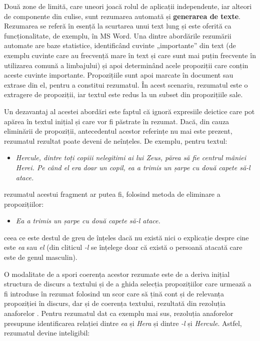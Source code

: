\begin{multicols}{2}
Două zone de limită, care uneori joacă rolul de aplicații independente, iar alteori de componente din culise, sunt rezumarea automată și \textbf{generarea de texte}. Rezumarea se referă în esență la scurtarea unui text lung și este oferită ca funcționalitate, de exemplu, în MS Word. Una dintre abordările rezumării automate are baze statistice, identificând cuvinte „importante” din text (de exemplu cuvinte care au frecvență mare în text și care sunt mai puțin frecvente în utilizarea comună a limbajului) și apoi determinând acele propoziții care conțin aceste cuvinte importante. Propozițiile sunt apoi marcate în document sau extrase din el, pentru a constitui rezumatul. În acest scenariu, rezumatul este o extragere de propoziții, iar textul este redus la un subset din propozițiile sale. 

Un dezavantaj al acestei abordări este faptul că ignoră expresiile deictice care pot apărea în textul inițial și care vor fi păstrate în rezumat. Dacă, din cauza eliminării de propoziții, antecedentul acestor referințe nu mai este prezent, rezumatul rezultat poate deveni de neînțeles. De exemplu, pentru textul:

\begin{itemize}
\item\textit{Hercule, dintre toți copiii nelegitimi ai lui Zeus, părea să fie centrul mâniei Herei. Pe când el era doar un copil, ea a trimis un șarpe cu două capete să-l atace.}
\end{itemize}

\noindent 
rezumatul acestui fragment ar putea fi, folosind metoda de eliminare a propozițiilor:

\begin{itemize}
\item\textit{Ea a trimis un șarpe cu două capete să-l atace.}
\end{itemize}

\noindent
ceea ce este destul de greu de înțeles dacă nu există nici o explicație despre cine este \textit{ea} sau \textit{el} (din cliticul 
\textit{-l} se înțelege doar că există o persoană atacată care este de genul masculin).

O modalitate de a spori coerența acestor rezumate este de a deriva inițial structura de discurs a textului și de a ghida selecția propozițiilor care urmează a fi introduse în rezumat folosind un scor care să țină cont și de relevanța propoziției în discurs, dar și de coerența textului, rezultată din rezoluția anaforelor \cite{cristea1}. Pentru rezumatul dat ca exemplu mai sus, rezoluția anaforelor presupune identificarea relației dintre \textit{ea} și \textit{Hera} și dintre \textit{-l} și \textit{Hercule}. Astfel, rezumatul devine inteligibil:


\end{multicols}
